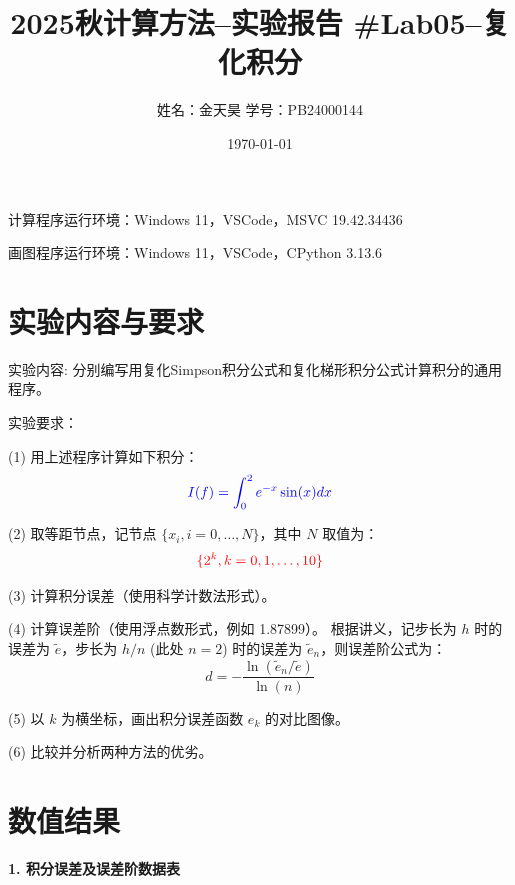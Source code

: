 \documentclass[UTF8]{ctexart}
\title{\bf 2025秋计算方法--实验报告 \#Lab05--复化积分}
\author{姓名：金天昊 \quad 学号：PB24000144 }
\date{\today}
\begin{document}
\maketitle

计算程序运行环境：Windows 11，VSCode，MSVC 19.42.34436

画图程序运行环境：Windows 11，VSCode，CPython 3.13.6

\section{实验内容与要求}

{\color{blue} 实验内容}:
分别编写用{\color{blue}复化Simpson积分公式}和{\color{blue}复化梯形积分公式}计算积分的通用程序。

{\color{blue} 实验要求}：

(1) 用上述程序计算如下积分：
$$ \color{blue} I(f) = \int_0^2 e^{-x} \sin(x) dx $$

(2) 取等距节点，记节点 $\{x_i, i=0,\dots,N\}$，其中 $N$ 取值为：
$$ \color{red} \{2^k, k=0, 1, \dots, 10\} $$

(3) 计算积分误差（使用{\color{red}科学计数法}形式）。

(4) 计算误差阶（使用{\color{red}浮点数}形式，例如 1.87899）。
根据讲义，记步长为 $h$ 时的误差为 $\tilde{e}$，步长为 $h/n$ (此处 $n=2$) 时的误差为 $\tilde{e}_n$，则误差阶公式为：
$$ d = - \frac{\ln(\tilde{e}_n / \tilde{e})}{\ln(n)} $$

(5) 以 $k$ 为横坐标，画出积分误差函数 $e_k$ 的对比图像。

(6) 比较并分析两种方法的优劣。

\section{数值结果}

{\bf 1. 积分误差及误差阶数据表}
\end{document}
